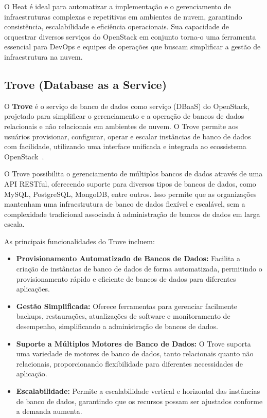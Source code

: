 O Heat é ideal para automatizar a implementação e o gerenciamento de infraestruturas complexas e repetitivas em ambientes de nuvem, garantindo consistência, escalabilidade e eficiência operacionais. Sua capacidade de orquestrar diversos serviços do OpenStack em conjunto torna-o uma ferramenta essencial para DevOps e equipes de operações que buscam simplificar a gestão de infraestrutura na nuvem.


\subsection{Trove (Database as a Service)}

O \textbf{Trove} é o serviço de banco de dados como serviço (DBaaS) do OpenStack, projetado para simplificar o gerenciamento e a operação de bancos de dados relacionais e não relacionais em ambientes de nuvem. O Trove permite aos usuários provisionar, configurar, operar e escalar instâncias de banco de dados com facilidade, utilizando uma interface unificada e integrada ao ecossistema OpenStack~\citep{OpenStackTrove}.

O Trove possibilita o gerenciamento de múltiplos bancos de dados através de uma API RESTful, oferecendo suporte para diversos tipos de bancos de dados, como MySQL, PostgreSQL, MongoDB, entre outros. Isso permite que as organizações mantenham uma infraestrutura de banco de dados flexível e escalável, sem a complexidade tradicional associada à administração de bancos de dados em larga escala.

As principais funcionalidades do Trove incluem:

\begin{itemize}
    \item \textbf{Provisionamento Automatizado de Bancos de Dados:} Facilita a criação de instâncias de banco de dados de forma automatizada, permitindo o provisionamento rápido e eficiente de bancos de dados para diferentes aplicações.
    \item \textbf{Gestão Simplificada:} Oferece ferramentas para gerenciar facilmente backups, restaurações, atualizações de software e monitoramento de desempenho, simplificando a administração de bancos de dados.
    \item \textbf{Suporte a Múltiplos Motores de Banco de Dados:} O Trove suporta uma variedade de motores de banco de dados, tanto relacionais quanto não relacionais, proporcionando flexibilidade para diferentes necessidades de aplicação.
    \item \textbf{Escalabilidade:} Permite a escalabilidade vertical e horizontal das instâncias de banco de dados, garantindo que os recursos possam ser ajustados conforme a demanda aumenta.
\end{itemize}

